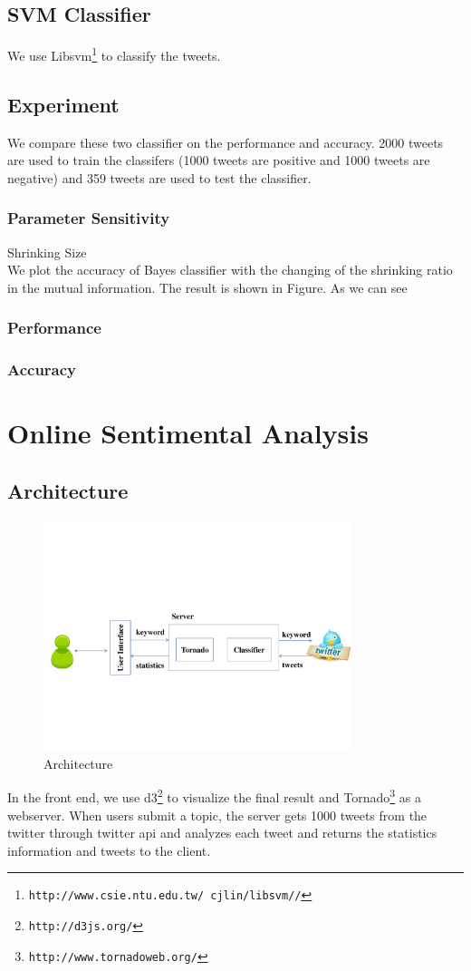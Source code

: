 \documentclass{article}
\begin{document}
\subsection{SVM Classifier}
We use Libsvm\footnote{\texttt{\scriptsize{http://www.csie.ntu.edu.tw/~cjlin/libsvm//‎‎}}} to classify the tweets. ‎
\subsection{Experiment}
We compare these two classifier on the performance and accuracy. 2000 tweets are used to train the classifers (1000 tweets are positive and 1000 tweets are negative) and 359 tweets are used to test the classifier.
\subsubsection{Parameter Sensitivity}
Shrinking Size \\
We plot the accuracy of Bayes classifier with the changing of the shrinking ratio in the mutual information. The result is shown in Figure. As we can see 
\subsubsection{Performance}
\subsubsection{Accuracy}
\section{Online Sentimental Analysis}
\subsection{Architecture}
\begin{figure}
\centering
\includegraphics[width=0.8\textwidth]{pics/architecture}
\caption{Architecture}
\label{Fig:architecture}
\end{figure}
In the front end, we use d3\footnote{\texttt{\scriptsize{http://d3js.org/‎‎}}} to visualize the final result and Tornado\footnote{\texttt{\scriptsize{http://www.tornadoweb.org/}}} as a webserver. When users submit a topic, the server gets 1000 tweets from the twitter through twitter api and analyzes each tweet and returns the statistics information and tweets to the client. 
\end{document}
